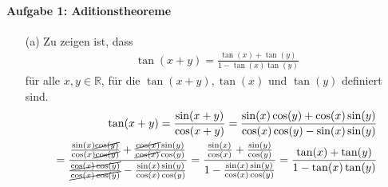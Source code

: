 	\paragraph{Aufgabe 1: Aditionstheoreme}
	\begin{itemize}
		\item[(a)] Zu zeigen ist, dass
		\begin{align*}
			\tan( x + y ) = \frac{ \tan( x ) + \tan( y ) }{ 1 - \tan( x ) \tan( y )}
		\end{align*}
		für alle $ x, y \in \mathbb{R} $, für die $ \tan( x + y ), \tan( x ) $ und $ \tan( y )$ definiert sind.
		\begin{align*}
			\tan( x + y ) 
			= \frac{ \sin( x + y ) }{ \cos( x + y ) } 
			= \frac{ \sin( x ) \cos( y ) + \cos( x ) \sin( y ) }
			{ \cos( x ) \cos( y ) - \sin( x ) \sin( y ) }
			\\
			= \frac{ \frac{ \sin( x ) \cancel{ \cos( y ) } }{ \cos( x ) \cancel{ \cos( y ) } } + \frac{ \cancel{ \cos( x ) } \sin( y ) }{ \cancel{ \cos( x ) } \cos( y ) } }
				{ \frac{ \cancel{ \cos( x )  \cos( y ) } }{ \cancel{ \cos( x ) \cos( y ) } } - \frac{ \sin( x ) \sin( y ) }{ \cos( x ) \cos( y ) } }
			= \frac{ \frac{ \sin( x )}{ \cos( x ) } + \frac{ \sin( y ) }{ \cos( y ) } }
				{ 1 - \frac{ \sin( x ) \sin( y ) }{ \cos( x ) \cos( y ) } } 
			= \frac{ \tan( x ) + \tan( y ) }{ 1 - \tan( x ) \tan( y ) }
		\end{align*}	

	\end{itemize}
